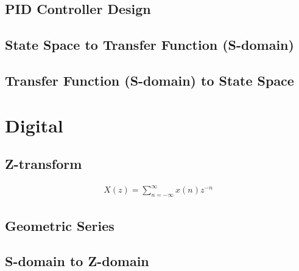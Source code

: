 \documentclass{article}
\newcommand{\sincludepdf}[2][]{
	
}
\begin{document}
\subsection{PID Controller Design}

\subsection{State Space to Transfer Function (S-domain)}

\sincludepdf[pages={2-3}]{scan/11211301.pdf}

\subsection{Transfer Function (S-domain) to State Space}

\sincludepdf[pages={4},
			pagecommand=\subsubsection{Example 1}
		]{scan/11211301.pdf}
\sincludepdf[pages={5}]{scan/11211301.pdf}

\section{Digital}

\subsection{Z-transform}

\begin{align}
	X(z) = \sum_{n = -\infty}^{\infty} x(n) z^{-n}
\end{align}

\sincludepdf[pages={6}]{scan/11211301.pdf}

\subsection{Geometric Series}

\sincludepdf[pages={7}]{scan/11211301.pdf}

\subsection{S-domain to Z-domain}
\end{document}
